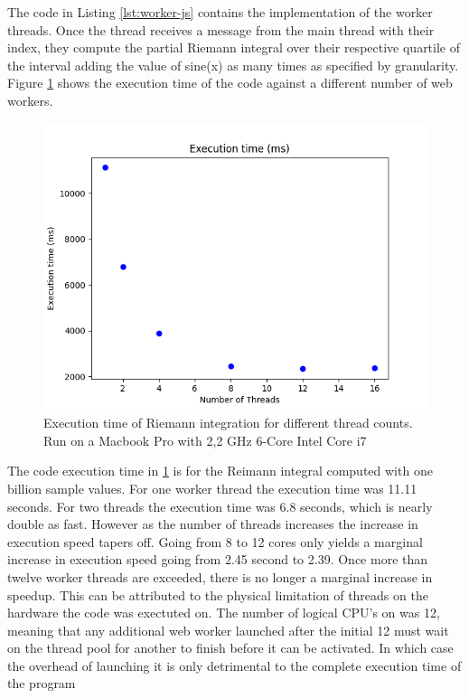 \documentclass[11pt]{article}
\begin{document}
The code in Listing \ref{lst:worker-js} contains the implementation of the worker threads. Once the thread receives a message from the main thread with their index, they compute the partial Riemann integral over their respective quartile of the interval adding the value of sine(x) as many times as specified by granularity. Figure \ref{png:integrate} shows the execution time of the code against a different number of web workers.



\begin{figure}[htbp]
\centerline{\includegraphics[scale=0.75]{figures/integrate_exe_times.png}}
\caption{Execution time of Riemann integration for different thread counts. Run on a Macbook Pro with 2,2 GHz 6-Core Intel Core i7}
\label{png:integrate}
\end{figure}

The code execution time in \ref{png:integrate} is for the Reimann integral computed with one billion sample values. For one worker thread the execution time was 11.11 seconds. For two threads the execution time was 6.8 seconds, which is nearly double as fast. However as the number of threads increases the increase in execution speed tapers off. Going from 8 to 12 cores only yields a marginal increase in execution speed going from 2.45 second to 2.39. Once more than twelve worker threads are exceeded, there is no longer a marginal increase in speedup. This can be attributed to the physical limitation of threads on the hardware the code was exectuted on. The number of logical CPU's on was 12, meaning that any additional web worker launched after the initial 12 must wait on the thread pool for another to finish before it can be activated. In which case the overhead of launching it is only detrimental to the complete execution time of the program
\end{document}
